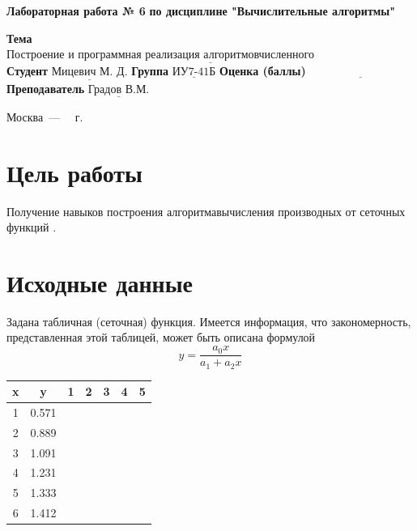 \documentclass[a4paper,12pt]{article}
\begin{document}
\begin{center}
	\noindent\begin{minipage}{1.3\textwidth}\centering
	\Large\textbf{  Лабораторная работа № 6}\newline
	\textbf{по дисциплине "Вычислительные алгоритмы"}\newline\newline\newline
	\end{minipage}
\end{center}

\noindent\textbf{Тема} $\underline{\text{Построение   и  программная   реализация   алгоритмовчисленного дифференцирования.}}$\newline\newline
\noindent\textbf{Студент} $\underline{\text{Мицевич М. Д.}}$\newline\newline
\noindent\textbf{Группа} $\underline{\text{ИУ7-41Б}}$\newline\newline
\noindent\textbf{Оценка (баллы)} $\underline{\text{~~~~~~~~~~~~~~~~~~~~~~~~~~~}}$\newline\newline
\noindent\textbf{Преподаватель} $\underline{\text{Градов В.М.}}$\newline

\begin{center}
	\vfill
	Москва~---~\the\year
~г.
\end{center}
\clearpage

\section{Цель работы}

\noindent Получение навыков построения алгоритмавычисления производных от сеточных функций .

\section{Исходные данные}
Задана табличная (сеточная) функция. Имеется информация, что закономерность, представленная этой таблицей, может быть описана  формулой
\[y = \frac{a_0x}{a_1 + a_2x}\]
\begin{tabular}{|c|c|c|c|c|c|c|}
    \hline
    x & y & 1 & 2 & 3 & 4 & 5 \\
    \hline
    1 & 0.571 & & & & & \\
    \hline
    2 & 0.889 & & & & & \\
    \hline
    3 & 1.091 & & & & & \\
    \hline
    4 & 1.231 & & & & & \\
    \hline
    5 & 1.333 & & & & & \\
    \hline
    6 & 1.412 & & & & & \\
    \hline
\end{tabular}
\end{document}
